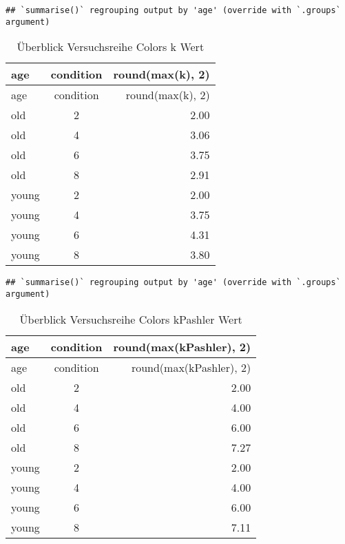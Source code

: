 \documentclass[
]{article}
\newenvironment{Shaded}{\begin{snugshade}}{\end{snugshade}}
\newcommand{\DataTypeTok}[1]{\textcolor[rgb]{0.13,0.29,0.53}{#1}}
\newcommand{\DecValTok}[1]{\textcolor[rgb]{0.00,0.00,0.81}{#1}}
\newcommand{\KeywordTok}[1]{\textcolor[rgb]{0.13,0.29,0.53}{\textbf{#1}}}
\newcommand{\NormalTok}[1]{#1}
\newcommand{\OperatorTok}[1]{\textcolor[rgb]{0.81,0.36,0.00}{\textbf{#1}}}
\newcommand{\StringTok}[1]{\textcolor[rgb]{0.31,0.60,0.02}{#1}}
\begin{document}
\begin{verbatim}
## `summarise()` regrouping output by 'age' (override with `.groups` argument)
\end{verbatim}

\begin{longtable}[]{@{}lcr@{}}
\caption{Überblick Versuchsreihe Colors k Wert}\tabularnewline
\toprule
age & condition & round(max(k), 2)\tabularnewline
\midrule
\endfirsthead
\toprule
age & condition & round(max(k), 2)\tabularnewline
\midrule
\endhead
old & 2 & 2.00\tabularnewline
old & 4 & 3.06\tabularnewline
old & 6 & 3.75\tabularnewline
old & 8 & 2.91\tabularnewline
young & 2 & 2.00\tabularnewline
young & 4 & 3.75\tabularnewline
young & 6 & 4.31\tabularnewline
young & 8 & 3.80\tabularnewline
\bottomrule
\end{longtable}

\begin{Shaded}
\end{Shaded}

\begin{verbatim}
## `summarise()` regrouping output by 'age' (override with `.groups` argument)
\end{verbatim}

\begin{longtable}[]{@{}lcr@{}}
\caption{Überblick Versuchsreihe Colors kPashler Wert}\tabularnewline
\toprule
age & condition & round(max(kPashler), 2)\tabularnewline
\midrule
\endfirsthead
\toprule
age & condition & round(max(kPashler), 2)\tabularnewline
\midrule
\endhead
old & 2 & 2.00\tabularnewline
old & 4 & 4.00\tabularnewline
old & 6 & 6.00\tabularnewline
old & 8 & 7.27\tabularnewline
young & 2 & 2.00\tabularnewline
young & 4 & 4.00\tabularnewline
young & 6 & 6.00\tabularnewline
young & 8 & 7.11\tabularnewline
\bottomrule
\end{longtable}

\begin{Shaded}
\end{Shaded}
\end{document}
